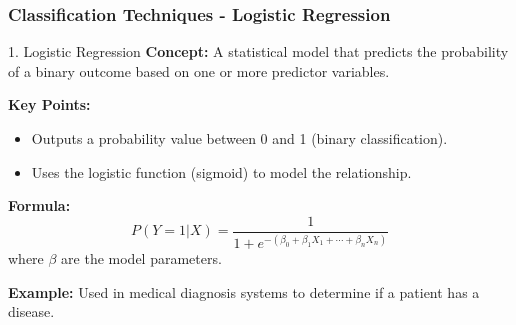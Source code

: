 \documentclass[aspectratio=169]{beamer}
\begin{document}
\begin{frame}[fragile]
    \frametitle{Classification Techniques - Logistic Regression}
    \begin{block}{1. Logistic Regression}
        \textbf{Concept:} A statistical model that predicts the probability of a binary outcome based on one or more predictor variables.
        
        \textbf{Key Points:}
        \begin{itemize}
            \item Outputs a probability value between 0 and 1 (binary classification).
            \item Uses the logistic function (sigmoid) to model the relationship.
        \end{itemize}

        \textbf{Formula:}
        \begin{equation}
            P(Y=1|X) = \frac{1}{1 + e^{-(\beta_0 + \beta_1X_1 + \cdots + \beta_nX_n)}}
        \end{equation}
        where \( \beta \) are the model parameters.

        \textbf{Example:} Used in medical diagnosis systems to determine if a patient has a disease.
    \end{block}
\end{frame}
\end{document}
